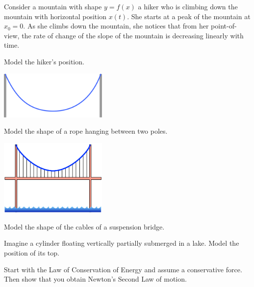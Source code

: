 \begin{exercises}

	\begin{problist}
	
	\prob Consider a mountain with shape $y=f(x)$ a hiker who is climbing down the mountain with horizontal position $x(t)$. She starts at a peak of the mountain at $x_0=0$. As she climbs down the mountain, she notices that from her point-of-view, the rate of change of the slope of the mountain is decreasing linearly with time.
	
		Model the hiker's position.
	
	\prob 
	
		\begin{center}
		\includegraphics*[width=150pt]{images/module20-catenary.pdf}
	\end{center}

	\prob Model the shape of a rope hanging between two poles.

	\begin{center}
		\includegraphics*[width=150pt]{images/module20-suspensionbridge.pdf}
	\end{center}

	\prob Model the shape of the cables of a suspension bridge.
	
	\prob Imagine a cylinder floating vertically partially submerged in a lake. Model the position of its top.
	
	
	\prob Start with the Law of Conservation of Energy and assume a conservative force. Then show that you obtain Newton's Second Law of motion.
	
	\end{problist}
\end{exercises}
